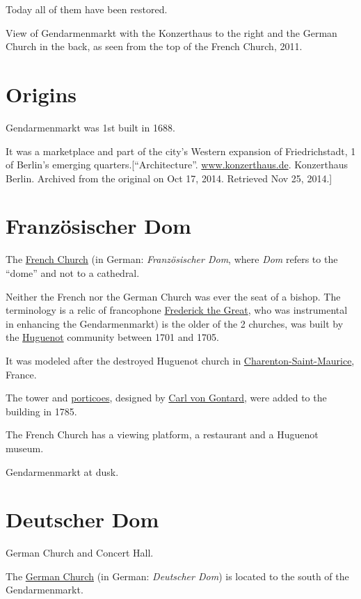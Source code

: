 \documentclass{book}
\numberwithin{equation}{section}
\begin{document}
Today all of them have been restored.

\textsf{View of Gendarmenmarkt with the Konzerthaus to the right and the German Church in the back, as seen from the top of the French Church, 2011.}

\section{Origins}
Gendarmenmarkt was 1st built in 1688.

It was a marketplace and part of the city's Western expansion of Friedrichstadt, 1 of Berlin's emerging quarters.[``Architecture''. \url{www.konzerthaus.de}. Konzerthaus Berlin. Archived from the original on Oct 17, 2014. Retrieved Nov 25, 2014.]

\section{Franz\"osischer Dom}
The \href{https://en.wikipedia.org/wiki/French_Cathedral}{French Church} (in German: \textit{Französischer Dom}, where \textit{Dom} refers to the ``dome'' and not to a cathedral.

Neither the French nor the German Church was ever the seat of a bishop. The terminology is a relic of francophone \href{https://en.wikipedia.org/wiki/Frederick_the_Great}{Frederick the Great}, who was instrumental in enhancing the Gendarmenmarkt) is the older of the 2 churches, was built by the \href{https://en.wikipedia.org/wiki/Huguenot}{Huguenot} community between 1701 and 1705.

It was modeled after the destroyed Huguenot church in \href{https://en.wikipedia.org/wiki/Saint-Maurice,_Val-de-Marne}{Charenton-Saint-Maurice}, France.

The tower and \href{https://en.wikipedia.org/wiki/Portico}{porticoes}, designed by \href{https://en.wikipedia.org/wiki/Carl_von_Gontard}{Carl von Gontard}, were added to the building in 1785.

The French Church has a viewing platform, a restaurant and a Huguenot museum. 

\textsf{Gendarmenmarkt at dusk.}

\section{Deutscher Dom}
\textsf{German Church and Concert Hall.}

The \href{https://en.wikipedia.org/wiki/German_Cathedral}{German Church} (in German: \textit{Deutscher Dom}) is located to the south of the Gendarmenmarkt.
\end{document}
